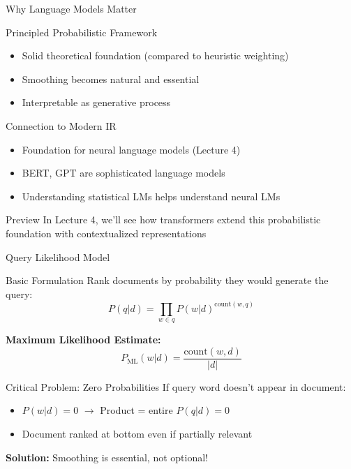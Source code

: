\documentclass[aspectratio=169]{beamer}
\begin{document}
\begin{frame}[shrink=10]{Why Language Models Matter}
\begin{block}{Principled Probabilistic Framework}
\begin{itemize}
    \item Solid theoretical foundation (compared to heuristic weighting)
    \item Smoothing becomes natural and essential
    \item Interpretable as generative process
\end{itemize}
\end{block}

\vspace{1em}

\begin{block}{Connection to Modern IR}
\begin{itemize}
    \item Foundation for neural language models (Lecture 4)
    \item BERT, GPT are sophisticated language models
    \item Understanding statistical LMs helps understand neural LMs
\end{itemize}
\end{block}

\vspace{1em}

\begin{alertblock}{Preview}
In Lecture 4, we'll see how transformers extend this probabilistic foundation with contextualized representations
\end{alertblock}
\end{frame}

\begin{frame}[shrink=5]{Query Likelihood Model}
\begin{block}{Basic Formulation}
Rank documents by probability they would generate the query:
$$P(q|d) = \prod_{w \in q} P(w|d)^{\text{count}(w,q)}$$
\end{block}

\vspace{1em}

\textbf{Maximum Likelihood Estimate:}
$$P_{\text{ML}}(w|d) = \frac{\text{count}(w,d)}{|d|}$$

\vspace{1em}

\begin{alertblock}{Critical Problem: Zero Probabilities}
If query word doesn't appear in document:
\begin{itemize}
    \item $P(w|d) = 0$ $\rightarrow$ Product = entire $P(q|d) = 0$
    \item Document ranked at bottom even if partially relevant
\end{itemize}
\end{alertblock}

\textbf{Solution:} Smoothing is essential, not optional!
\end{frame}
\end{document}

